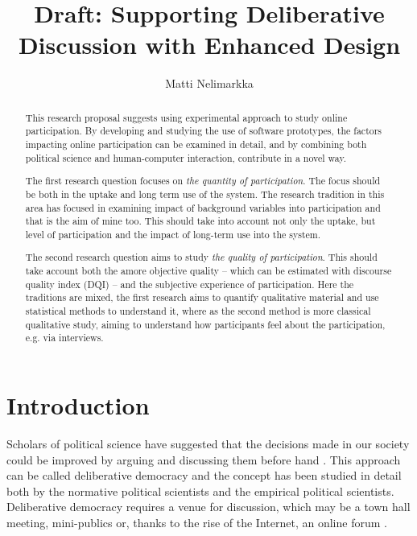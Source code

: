 \documentclass[journal,a4paper]{IEEEtran}
\author{Matti Nelimarkka}
\title{Draft: Supporting Deliberative Discussion with Enhanced Design}
\begin{document}
\maketitle

\setlength{\parindent}{0pt}
\setlength{\parskip}{1ex}

\begin{abstract}
This research proposal suggests using experimental approach to study online participation. By developing and studying the use of software prototypes, the factors impacting online participation can be examined in detail, and by combining both political science and human-computer interaction, contribute in a novel way.

The first research question focuses on \textit{the quantity of participation}. The focus should be both in the uptake and long term use of the system. The research tradition in this area has focused in examining impact of background variables into participation and that is the aim of mine too. This should take into account not only the uptake, but level of participation and the impact of long-term use into the system.

The second research question aims to study \textit{the quality of participation}. This should take account both the amore objective quality -- which can be estimated with   discourse quality index (DQI) -- and the subjective experience of participation. Here the traditions are mixed, the first research aims to quantify qualitative material and use statistical methods to understand it, where as the second method is more classical qualitative study, aiming to understand how participants feel about the participation, e.g. via interviews.
\end{abstract}

\section{Introduction}
Scholars of political science have suggested that the decisions made in our society could be improved by arguing and discussing them before hand . This approach can be called deliberative democracy and the concept has been studied in detail both by the normative political scientists and the empirical political scientists. Deliberative democracy requires a venue for discussion, which may be a town hall meeting, mini-publics or, thanks to the rise of the Internet, an online forum .
\end{document}
